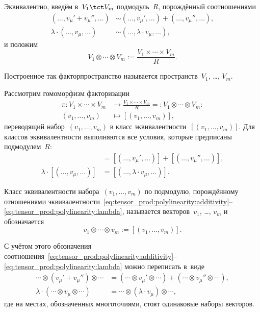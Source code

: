 Эквивалентно, введём в~$V_1 \tct V_m$ подмодуль~$R$, порождённый соотношениями
\begin{align*}
	(\dots, v_\mu' + v_\mu'', \dots)
	&\sim
	(\dots, v_\mu', \dots) +
	(\dots, v_\mu'', \dots),
	\\
	\lambda \cdot
	(\dots, v_\mu, \dots)
	&\sim
	(\dots, \lambda \cdot v_\mu, \dots)
	,
\end{align*}
и положим
\[
	V_1 \otimes \cdots \otimes V_m
	:=
	\frac{
		V_1 \times \cdots \times V_m
	}{R}
	.
\]

Построенное так факторпространство называется  пространств~$V_1$, \dots, $V_m$.

Рассмотрим гомоморфизм факторизации
\begin{align*}
	\pi
	\colon
	V_1 \times \cdots \times V_m
	&\to
	\frac{
		V_1 \times \cdots \times V_m
	}{R}
	=:
	V_1 \otimes \cdots \otimes V_m
	\colon
	\\
	(v_1, \dots, v_m)
	&\mapsto
	[(v_1, \dots, v_m)]
	,
\end{align*}
переводящий набор~$(v_1, \dots, v_m)$ в класс эквивалентности~$[(v_1, \dots, v_m)]$. Для классов эквивалентности выполняются все условия, которые предписаны подмодулем~$R$:
\begin{align*}
	[(\dots, v_\mu' + v_\mu'', \dots)] &=
	[(\dots, v_\mu', \dots)] +
	[(\dots, v_\mu'', \dots)]
	,
	\\
	\lambda \cdot
	[(\dots, v_\mu, \dots)] &=
	[(\dots, \lambda \cdot v_\mu, \dots)]
	.
\end{align*}

\begin{definition}
	Класс эквивалентности набора~$(v_1, \dots, v_m)$ по подмодулю, порождённому отношениями эквивалентности~\eqref{eq:tensor_prod:polylinearity:additivity}--\eqref{eq:tensor_prod:polylinearity:lambda}, называется  векторов~$v_1$, \dots, $v_m$ и обозначается
	\[
		v_1 \otimes \cdots \otimes v_m
		:=
		[(v_1, \dots, v_m)]
		.
	\]
\end{definition}

С учётом этого обозначения соотношения~\eqref{eq:tensor_prod:polylinearity:additivity}--\eqref{eq:tensor_prod:polylinearity:lambda} можно переписать в~виде
\begin{align*}
	\cdots \otimes (v_\mu' + v_\mu'') \otimes \cdots &=
	(\cdots \otimes v_\mu' \otimes \cdots) +
	(\cdots \otimes v_\mu'' \otimes \cdots)
	,
	\\
	\lambda \cdot
	(\cdots \otimes v_\mu \otimes \cdots) &=
	\cdots \otimes (\lambda \cdot v_\mu) \otimes \cdots
	,
\end{align*}
где на местах, обозначенных многоточиями, стоят одинаковые наборы векторов.

